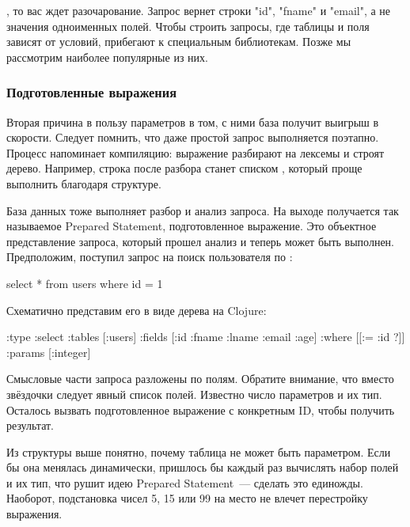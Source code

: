 \noindent
, то вас ждет разочарование. Запрос вернет строки "id", "fname" и "email", а не значения одноименных полей. Чтобы строить запросы, где таблицы и поля зависят от условий, прибегают к специальным библиотекам. Позже мы рассмотрим наиболее популярные из них.

\subsubsection{Подготовленные выражения}

Вторая причина в пользу параметров в том, с ними база получит выигрыш в скорости. Следует помнить, что даже простой запрос выполняется поэтапно. Процесс напоминает компиляцию: выражение разбирают на лексемы и строят дерево. Например, строка  после разбора станет списком , который проще выполнить благодаря структуре.

База данных тоже выполняет разбор и анализ запроса. На выходе получается так называемое Prepared Statement, подготовленное выражение. Это объектное представление запроса, который прошел анализ и теперь может быть выполнен. Предположим, поступил запрос на поиск пользователя по :

\begin{english}
  \begin{sql}
select * from users where id = 1
  \end{sql}
\end{english}

Схематично представим его в виде дерева на Clojure:

\begin{english}
  \begin{clojure}
{:type :select
 :tables [:users]
 :fields [:id :fname :lname :email :age]
 :where [[:= :id ?]]
 :params [:integer]}
  \end{clojure}
\end{english}

Смысловые части запроса разложены по полям. Обратите внимание, что вместо звёздочки следует явный список полей. Известно число параметров и их тип. Осталось вызвать подготовленное выражение с конкретным ID, чтобы получить результат.

Из структуры выше понятно, почему таблица не может быть параметром. Если бы она менялась динамически, пришлось бы каждый раз вычислять набор полей и их тип, что рушит идею Prepared Statement~--- сделать это единожды. Наоборот, подстановка чисел 5, 15 или 99 на место  не влечет перестройку выражения.

